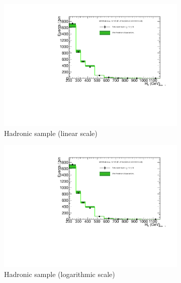 \clearpage
\begin{figure}[h!]
  \centering
  \begin{subfigure}[b]{0.48\textwidth}
    \includegraphics[width=\textwidth,page=1]
    {Figs/results/v0/greenBand/bestFit_2012dev_RQcdZero_fZinvAll_1b_le3j-12p_smOnly}
    \caption{Hadronic sample (linear scale)}
  \end{subfigure}
  \begin{subfigure}[b]{0.48\textwidth}
    \includegraphics[width=\textwidth,page=2]
    {Figs/results/v0/greenBand/bestFit_2012dev_RQcdZero_fZinvAll_1b_le3j-12p_smOnly}
    \caption{Hadronic sample (logarithmic scale)}
  \end{subfigure}
  \begin{subfigure}[b]{0.48\textwidth}

\end{subfigure}
\end{figure}
